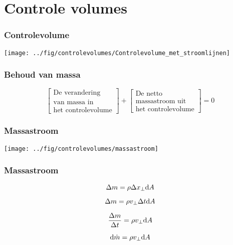 \documentclass[t]{beamer}
\begin{document}
  	\section{Controle volumes}	
  		\begin{frame}
			\frametitle{Controlevolume}
			\center
			\texttt{[image: ../fig/controlevolumes/Controlevolume\_met\_stroomlijnen]}
  		\end{frame}
  		\begin{frame}
			\frametitle{Behoud van massa}
			\vspace{2cm}
			\begin{equation*}
				\left[
					\begin{array}{c}
						\mbox{De verandering} \\ \mbox{van massa in} \\ \mbox{het controlevolume}
					\end{array}
				\right]
				+
				\left[
					\begin{array}{c}
						\mbox{De netto} \\ \mbox{massastroom uit} \\ \mbox{het controlevolume}
					\end{array}
				\right]
				= 0
			\end{equation*}
		\end{frame}	
		\begin{frame}
			\frametitle{Massastroom}
			\vspace{1cm}
			\center
			\texttt{[image: ../fig/controlevolumes/massastroom]}
  		\end{frame}
  		\begin{frame}
  			\frametitle{Massastroom}
  			\begin{equation*}
				\Delta m = \rho \Delta x_{\perp} \mathrm{d} A
			\end{equation*}
  			
  			\pause
  			\begin{equation*}
				\Delta m = \rho v_{\perp} \Delta t \mathrm{d} A
			\end{equation*}
			
			\pause
  			\begin{equation*}
				\frac{\Delta m}{\Delta t} = \rho v_{\perp} \mathrm{d} A
			\end{equation*}
			
			\pause
			\begin{equation}
				\mathrm{d} \dot{m}  = \rho v_{\perp} \mathrm{d} A
				\label{eqn:massastroom}
			\end{equation}
  		\end{frame}
\end{document}
